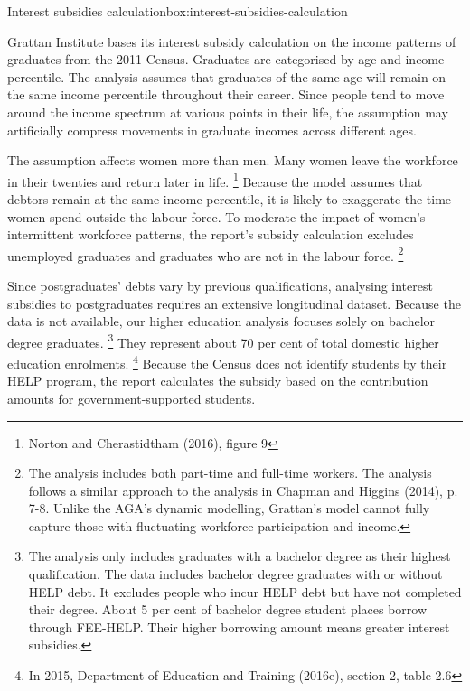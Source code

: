 \documentclass[embargoed]{grattan}
\begin{document}
\begin{smallbox}{Interest subsidies calculation}{box:interest-subsidies-calculation}

Grattan Institute bases its interest subsidy calculation on the income patterns of graduates from the 2011 Census.
Graduates are categorised by age and income percentile.
The analysis assumes that graduates of the same age will remain on the same income percentile throughout their career.
Since people tend to move around the income spectrum at various points in their life, the assumption may artificially compress movements in graduate incomes across different ages.

The assumption affects women more than men.
Many women leave the workforce in their twenties and return later in life.%
\footnote{Norton and Cherastidtham (2016), figure 9} Because the model assumes that debtors remain at the same income percentile, it is likely to exaggerate the time women spend outside the labour force.
To moderate the impact of women's intermittent workforce patterns, the report's subsidy calculation excludes unemployed graduates and graduates who are not in the labour force.%
\footnote{The analysis includes both part-time and full-time workers.
The analysis follows a similar approach to the analysis in Chapman and Higgins (2014), p. 7-8.
Unlike the \gls{AGA}'s dynamic modelling, Grattan's model cannot fully capture those with fluctuating workforce participation and income.}

Since postgraduates' debts vary by previous qualifications, analysing interest subsidies to postgraduates requires an extensive longitudinal dataset.
Because the data is not available, our higher education analysis focuses solely on bachelor degree graduates.%
\footnote{The analysis only includes graduates with a bachelor degree as their highest qualification.
The data includes bachelor degree graduates with or without HELP debt.
It excludes people who incur HELP debt but have not completed their degree.
About 5 per cent of bachelor degree student places borrow through FEE-HELP.
Their higher borrowing amount means greater interest subsidies.} They represent about 70 per cent of total domestic higher education enrolments.%
\footnote{In 2015, Department of Education and Training (2016e), section 2, table 2.6} Because the Census does not identify students by their HELP program, the report calculates the subsidy based on the contribution amounts for government-supported students.
\end{smallbox}
\end{document}
